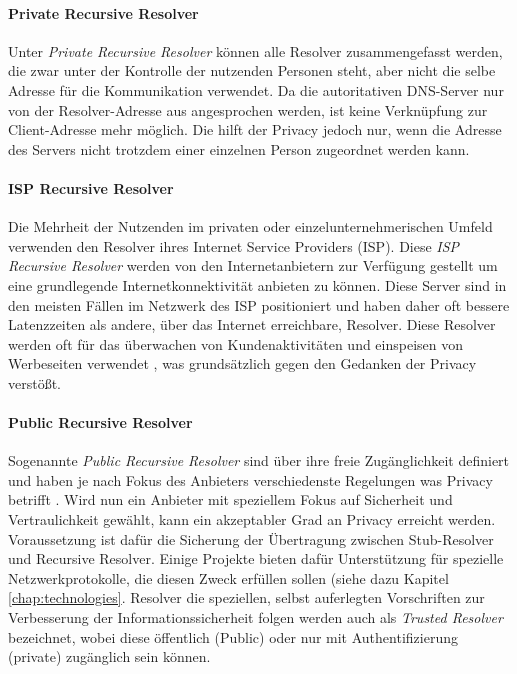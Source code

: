\paragraph{Private Recursive Resolver}
Unter \textit{Private Recursive Resolver} können alle Resolver zusammengefasst werden, die zwar unter der Kontrolle der nutzenden Personen steht, aber nicht die selbe Adresse für die Kommunikation verwendet. Da die autoritativen DNS-Server nur von der Resolver-Adresse aus angesprochen werden, ist keine Verknüpfung zur Client-Adresse mehr möglich. Die hilft der Privacy jedoch nur, wenn die Adresse des Servers nicht trotzdem einer einzelnen Person zugeordnet werden kann.

\paragraph{ISP Recursive Resolver}
Die Mehrheit der Nutzenden im privaten oder einzelunternehmerischen Umfeld verwenden den Resolver ihres Internet Service Providers (ISP). Diese \textit{ISP Recursive Resolver} werden von den Internetanbietern zur Verfügung gestellt um eine grundlegende Internetkonnektivität anbieten zu können. Diese Server sind in den meisten Fällen im Netzwerk des ISP positioniert und haben daher oft bessere Latenzzeiten als andere, über das Internet erreichbare, Resolver. Diese Resolver werden oft für das überwachen von Kundenaktivitäten und einspeisen von Werbeseiten verwendet \cite{Weaver2011}, was grundsätzlich gegen den Gedanken der Privacy verstößt.

\paragraph{Public Recursive Resolver}
Sogenannte \textit{Public Recursive Resolver} sind über ihre freie Zugänglichkeit definiert und haben je nach Fokus des Anbieters verschiedenste Regelungen was Privacy betrifft \cite{Prince2018}\cite{Quad92018}. Wird nun ein Anbieter mit speziellem Fokus auf Sicherheit und Vertraulichkeit gewählt, kann ein akzeptabler Grad an Privacy erreicht werden. Voraussetzung ist dafür die Sicherung der Übertragung zwischen Stub-Resolver und Recursive Resolver. Einige Projekte bieten dafür Unterstützung für spezielle Netzwerkprotokolle, die diesen Zweck erfüllen sollen (siehe dazu Kapitel \ref{chap:technologies}. Resolver die speziellen, selbst auferlegten Vorschriften zur Verbesserung der Informationssicherheit folgen werden auch als \textit{Trusted Resolver} bezeichnet, wobei diese öffentlich (Public) oder nur mit Authentifizierung (private) zugänglich sein können.

